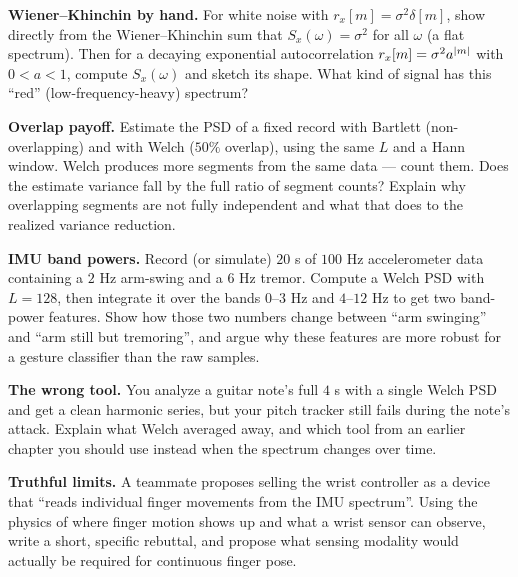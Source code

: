 \begin{exercise}
\textbf{Wiener--Khinchin by hand.} For white noise with $r_x[m]=\sigma^2\delta[m]$,
show directly from the Wiener--Khinchin sum that $S_x(\omega)=\sigma^2$ for all
$\omega$ (a flat spectrum). Then for a decaying exponential autocorrelation
$r_x[m]=\sigma^2 a^{\lvert m\rvert}$ with $0<a<1$, compute $S_x(\omega)$ and sketch its
shape. What kind of signal has this ``red'' (low-frequency-heavy) spectrum?
\end{exercise}

\begin{exercise}
\textbf{Overlap payoff.} Estimate the PSD of a fixed record with Bartlett
(non-overlapping) and with Welch ($50\%$ overlap), using the same $L$ and a Hann
window. Welch produces more segments from the same data --- count them. Does the
estimate variance fall by the full ratio of segment counts? Explain why overlapping
segments are not fully independent and what that does to the realized variance
reduction.
\end{exercise}

\begin{exercise}
\textbf{IMU band powers.} Record (or simulate) $20$ s of $100$ Hz accelerometer
data containing a $2$ Hz arm-swing and a $6$ Hz tremor. Compute a Welch PSD with
$L=128$, then integrate it over the bands $0$--$3$ Hz and $4$--$12$ Hz to get two
band-power features. Show how those two numbers change between ``arm swinging'' and
``arm still but tremoring'', and argue why these features are more robust for a
gesture classifier than the raw samples.
\end{exercise}

\begin{exercise}
\textbf{The wrong tool.} You analyze a guitar note's full $4$ s with a single
Welch PSD and get a clean harmonic series, but your pitch tracker still fails during
the note's attack. Explain what Welch averaged away, and which tool from an earlier
chapter you should use instead when the spectrum changes over time.
\end{exercise}

\begin{exercise}
\textbf{Truthful limits.} A teammate proposes selling the wrist controller as a
device that ``reads individual finger movements from the IMU spectrum''. Using the
physics of where finger motion shows up and what a wrist sensor can observe, write
a short, specific rebuttal, and propose what sensing modality would actually be
required for continuous finger pose.
\end{exercise}
